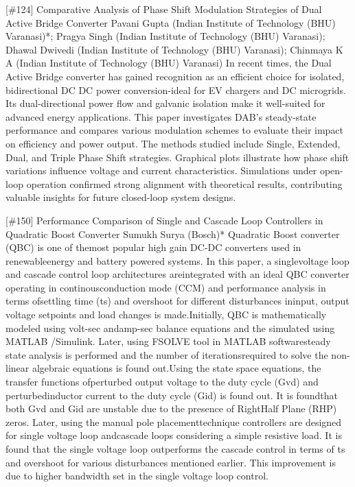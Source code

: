 {} \begin{abstract_online} {[\#124] Comparative Analysis of Phase Shift Modulation Strategies of Dual Active Bridge Converter} {} {Pavani Gupta (Indian Institute of Technology (BHU) Varanasi)*; Pragya Singh (Indian Institute of Technology (BHU) Varanasi); Dhawal Dwivedi (Indian Institute of Technology (BHU) Varanasi); Chinmaya K A (Indian Institute of Technology (BHU) Varanasi)} {} In recent times, the Dual Active Bridge converter has gained recognition as an efficient choice for isolated, bidirectional DC DC power conversion-ideal for EV chargers and DC microgrids. Its dual-directional power flow and galvanic isolation make it well-suited for advanced energy applications. This paper investigates DAB's steady-state performance and compares various modulation schemes to evaluate their impact on efficiency and power output. The methods studied include Single, Extended, Dual, and Triple Phase Shift strategies. Graphical plots illustrate how phase shift variations influence voltage and current characteristics. Simulations under open-loop operation confirmed strong alignment with theoretical results, contributing valuable insights for future closed-loop system designs. \end{abstract_online} 
{} \begin{abstract_online} {[\#150] Performance Comparison of Single and Cascade Loop Controllers in Quadratic Boost Converter} {} {Sumukh Surya (Bosch)*} {} Quadratic Boost converter (QBC) is one of themost popular high gain DC-DC converters used in renewableenergy and battery powered systems. In this paper, a singlevoltage loop and cascade control loop architectures areintegrated with an ideal QBC converter operating in continousconduction mode (CCM) and performance analysis in terms ofsettling time (ts) and overshoot for different disturbances ininput, output voltage setpoints and load changes is made.Initially, QBC is mathematically modeled using volt-sec andamp-sec balance equations and the simulated using MATLAB /Simulink. Later, using FSOLVE tool in MATLAB softwaresteady state analysis is performed and the number of iterationsrequired to solve the non-linear algebraic equations is found out.Using the state space equations, the transfer functions ofperturbed output voltage to the duty cycle (Gvd) and perturbedinductor current to the duty cycle (Gid) is found out. It is foundthat both Gvd and Gid are unstable due to the presence of RightHalf Plane (RHP) zeros. Later, using the manual pole placementtechnique controllers are designed for single voltage loop andcascade loops considering a simple resistive load. It is found that the single voltage loop outperforms the cascade control in terms of ts and overshoot for various disturbances mentioned earlier. This improvement is due to higher bandwidth set in the single voltage loop control. \end{abstract_online} 
